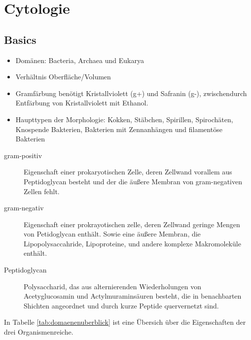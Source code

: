 \section{Cytologie}

\subsection{Basics}

	\begin{itemize}
		\item Domänen: Bacteria, Archaea und Eukarya
		\item Verhältnis Oberfläche/Volumen 
		\item Gramfärbung benötigt Kristallviolett (g+) und Safranin (g-),
			zwischendurch Entfärbung von Kristallviolett mit Ethanol.
		\item Haupttypen der Morphologie: 
			Kokken,
			Stäbchen,
			Spirillen,
			Spirochäten,
			Knospende Bakterien,
			Bakterien mit Zennanhängen
			und filamentöse Bakterien
	\end{itemize}

	\begin{description}
		\item[gram-positiv]
			Eigenschaft einer prokaryotischen Zelle,
			deren Zellwand vorallem aus Peptidoglycan besteht
			und der die äußere Membran von gram-negativen Zellen fehlt.

		\item[gram-negativ] 
			Eigenschaft einer prokrayotischen zelle,
			deren Zellwand geringe Mengen von Petidoglycan enthält.
			Sowie eine äußere Membran,
			die Lipopolysaccahride,
			Lipoproteine,
			und andere komplexe Makromoleküle enthält.

		\item[Peptidoglycan]
			Polysaccharid,
			das aus alternierenden Wiederholungen von Acetyglucosamin und Actylmuraminsäuren besteht,
			die in benachbarten Shichten angeordnet
			und durch kurze Peptide quervernetzt sind.

	\end{description}

	In Tabelle \ref{tab:domaenenuberblick} ist eine Übersich über die Eigenschaften der drei Organismenreiche.	

